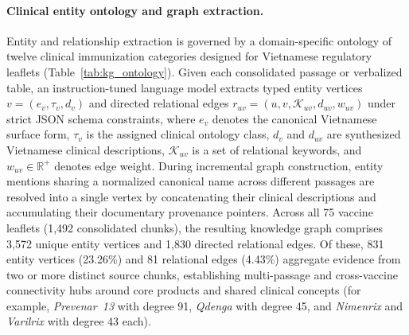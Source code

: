 \documentclass[sn-mathphys, oneside]{sn-jnl}
\begin{document}
\paragraph{Clinical entity ontology and graph extraction.}
Entity and relationship extraction is governed by a domain-specific ontology of twelve clinical immunization categories designed for Vietnamese regulatory leaflets (Table~\ref{tab:kg_ontology}). Given each consolidated passage or verbalized table, an instruction-tuned language model extracts typed entity vertices $v = (e_v, \tau_v, d_v)$ and directed relational edges $r_{uv} = (u, v, \mathcal{K}_{uv}, d_{uv}, w_{uv})$ under strict JSON schema constraints, where $e_v$ denotes the canonical Vietnamese surface form, $\tau_v$ is the assigned clinical ontology class, $d_v$ and $d_{uv}$ are synthesized Vietnamese clinical descriptions, $\mathcal{K}_{uv}$ is a set of relational keywords, and $w_{uv} \in \mathbb{R}^+$ denotes edge weight. During incremental graph construction, entity mentions sharing a normalized canonical name across different passages are resolved into a single vertex by concatenating their clinical descriptions and accumulating their documentary provenance pointers. Across all 75 vaccine leaflets (1,492 consolidated chunks), the resulting knowledge graph comprises 3,572 unique entity vertices and 1,830 directed relational edges. Of these, 831 entity vertices (23.26\%) and 81 relational edges (4.43\%) aggregate evidence from two or more distinct source chunks, establishing multi-passage and cross-vaccine connectivity hubs around core products and shared clinical concepts (for example, \emph{Prevenar~13} with degree 91, \emph{Qdenga} with degree 45, and \emph{Nimenrix} and \emph{Varilrix} with degree 43 each).
\end{document}
